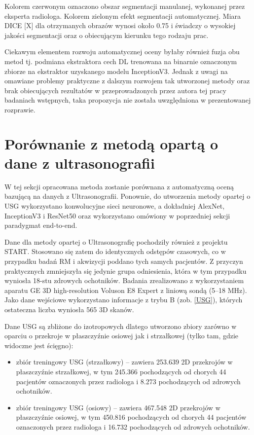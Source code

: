 Kolorem czerwonym oznaczono obszar segmentacji manulanej, wykonanej przez eksperta radiologa. Kolorem zielonym efekt segmentacji automatycznej. Miara DICE [X] dla otrzymanych obrazów wynosi około 0.75 i świadczy o wysokiej jakości segmentacji oraz o obiecującym kierunku tego rodzaju prac.

Ciekawym elementem rozwoju automatycznej oceny byłaby również fuzja obu metod tj. podmiana ekstraktora cech DL trenowana na binarnie oznaczonym zbiorze na ekstraktor uzyskanego modelu InceptionV3. Jednak z uwagi na omawiane problemy praktyczne z dalszym rozwojem tak utworzonej metody oraz brak obiecujących rezultatów w przeprowadzonych przez autora tej pracy badaniach wstępnych, taka propozycja nie została uwzględniona w prezentowanej rozprawie. 

\section{Porównanie z metodą opartą o dane z ultrasonografii}

W tej sekcji opracowana metoda zostanie porównana z automatyczną oceną bazującą na danych z Ultrasonografii. Ponownie, do utworzenia metody opartej o USG wykorzystano konwolucyjne sieci neuronowe, a dokładniej AlexNet, InceptionV3 i ResNet50 oraz wykorzystano omówiony w poprzedniej sekcji paradygmat end-to-end. 

Dane dla metody opartej o Ultrasonografię pochodziły również z projektu START. Stosowano się zatem do identycznych odstępów czasowych, co w przypadku badań RM i akwizycji poddano tych samych pacjentów. Z przyczyn praktycznych zmniejszyła się jedynie grupa odniesienia, która w tym przypadku wyniosła 18-stu zdrowych ochotników. Badania zrealizowano z wykorzystaniem aparatu GE 3D high-resolution Voluson E8 Expert z liniową sondą (5--18 MHz). Jako dane wejściowe wykorzystano informacje z trybu B (zob. \ref{USG}), których ostateczna liczba wyniosła 565 3D skanów. 

Dane USG są zbliżone do izotropowych dlatego utworzono zbiory zarówno w oparciu o przekroje w płaszczyźnie osiowej jak i strzałkowej (tylko tam, gdzie widoczne jest ścięgno):
\begin{itemize}
	\item zbiór treningowy USG (strzałkowy) -- zawiera 253.639 2D przekrojów w płaszczyźnie strzałkowej, w tym 245.366 pochodzących od chorych 44 pacjentów oznaczonych przez radiologa i 8.273 pochodzących od zdrowych ochotników.
	\item zbiór treningowy USG (osiowy) -- zawiera 467.548 2D przekrojów w płaszczyźnie osiowej, w tym 450.816 pochodzących od chorych 44 pacjentów oznaczonych przez radiologa i 16.732 pochodzących od zdrowych ochotników. 
\end{itemize}

